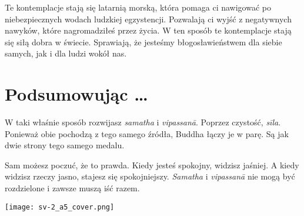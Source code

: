 \documentclass[12pt,openany]{book}
\begin{document}
Te kontemplacje stają się latarnią morską, która pomaga ci nawigować po niebezpiecznych wodach ludzkiej egzystencji. Pozwalają ci wyjść z negatywnych nawyków, które nagromadziłeś przez życia. W ten sposób te kontemplacje stają się siłą dobra w świecie. Sprawiają, że jesteśmy błogosławieństwem dla siebie samych, jak i dla ludzi wokół nas.

\chapter*{Podsumowując …}

W taki właśnie sposób rozwijasz \textit{samatha} i \textit{vipassanā}. Poprzez czystość, \textit{sīla}. Ponieważ obie pochodzą z tego samego źródła, Buddha łączy je w parę. Są jak dwie strony tego samego medalu.

Sam możesz poczuć, że to prawda. Kiedy jesteś spokojny, widzisz jaśniej. A kiedy widzisz rzeczy jasno, stajesz się spokojniejszy. \textit{Samatha} i \textit{vipassanā} nie mogą być rozdzielone i zawsze muszą iść razem.



\hspace*{-7mm}
\texttt{[image: sv-2\_a5\_cover.png]}
\end{document}
